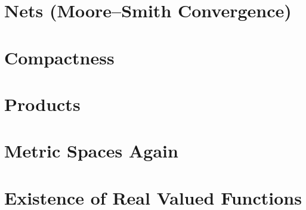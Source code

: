 \section{Nets (Moore--Smith Convergence)}





\section{Compactness}




\section{Products}
\addtocounter{subsection}{1}

\addtocounter{subsection}{-2}

\addtocounter{subsection}{1}








\section{Metric Spaces Again}






\section{Existence of Real Valued Functions}

